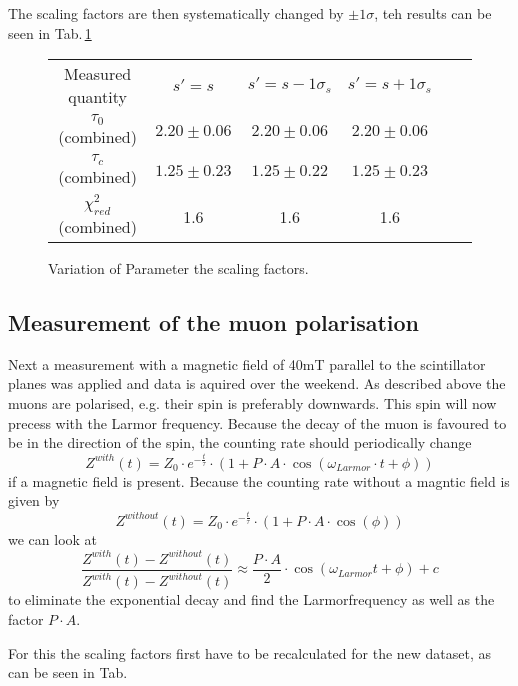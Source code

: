 The scaling factors are then systematically changed by $\pm1\sigma$, teh results can be seen in Tab.\,\ref{t:vars}
\begin{figure}
\begin{tabularx}{\textwidth}{| c | c | c | c | c | c |}
Measured quantity & $s' = s$  & $s' = s-1\sigma_s$ & $s' = s+1\sigma_s$ \\
$\tau_0$ (combined) & $2.20\pm0.06$ & $2.20\pm0.06$ & $2.20\pm0.06$ \\
$\tau_c$ (combined) & $1.25\pm0.23$ & $1.25\pm0.22$ & $1.25\pm0.23$ \\  
$\chi^2_{red}$ (combined) & 1.6 & 1.6 & 1.6
\end{tabularx}
\caption{Variation of Parameter the scaling factors.}
\label{t:vars}
\end{figure}

\subsection{Measurement of the muon polarisation}
Next a measurement with a magnetic field of 40mT parallel to the scintillator planes was applied and data is aquired over the weekend. As described above the muons are polarised, e.g. their spin is preferably downwards. This spin will now precess with the Larmor frequency. Because the decay of the muon is favoured to be in the direction of the spin, the counting rate should periodically change
\begin{equation}
	Z^{with}(t)=Z_0\cdot e^{-\frac{t}{\tau}}\cdot(1+P\cdot A\cdot\cos(\omega_{Larmor}\cdot t +\phi))
\end{equation}
if a magnetic field is present. Because the counting rate without a magntic field is given by 
\begin{equation}
	Z^{without}(t) = Z_0\cdot e^{-\frac{t}{\tau}}\cdot(1+P\cdot A\cdot\cos(\phi))
\end{equation}
we can look at 
\begin{equation}
	\frac{Z^{with}(t)-Z^{without}(t)}{Z^{with}(t)-Z^{without}(t)}\approx \frac{P\cdot A}{2}\cdot \cos(\omega_{Larmor}t+\phi)+c
\end{equation}
to eliminate the exponential decay and find the Larmorfrequency as well as the factor $P\cdot A$. 

For this the scaling factors first have to be recalculated for the new dataset, as can be seen in Tab.\,

